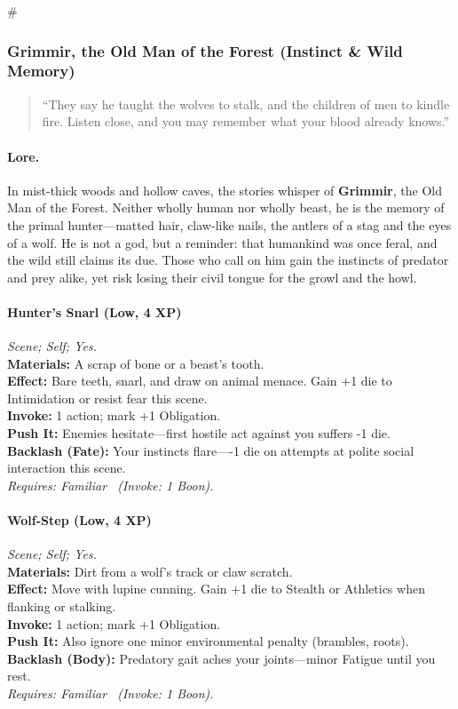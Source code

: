 # %

\subsubsection{Grimmir, the Old Man of the Forest (Instinct \& Wild Memory)}
\begin{quote}
“They say he taught the wolves to stalk, and the children of men to kindle fire. Listen close, and you may remember what your blood already knows.”
\end{quote}

\paragraph{Lore.}
In mist-thick woods and hollow caves, the stories whisper of \textbf{Grimmir}, the Old Man of the Forest. Neither wholly human nor wholly beast, he is the memory of the primal hunter—matted hair, claw-like nails, the antlers of a stag and the eyes of a wolf. He is not a god, but a reminder: that humankind was once feral, and the wild still claims its due. Those who call on him gain the instincts of predator and prey alike, yet risk losing their civil tongue for the growl and the howl.

\paragraph*{Hunter's Snarl (Low, 4 XP)} \emph{Scene; Self; Yes.}\\
\textbf{Materials:} A scrap of bone or a beast's tooth.\\
\textbf{Effect:} Bare teeth, snarl, and draw on animal menace. Gain +1 die to Intimidation or resist fear this scene.\\
\textbf{Invoke:} 1 action; mark +1 Obligation.\\
\textbf{Push It:} Enemies hesitate—first hostile act against you suffers -1 die.\\
\textbf{Backlash (Fate):} Your instincts flare—-1 die on attempts at polite social interaction this scene.\\
\emph{Requires: Familiar \ (\textit{Invoke:} 1 Boon).}

\paragraph*{Wolf-Step (Low, 4 XP)} \emph{Scene; Self; Yes.}\\
\textbf{Materials:} Dirt from a wolf's track or claw scratch.\\
\textbf{Effect:} Move with lupine cunning. Gain +1 die to Stealth or Athletics when flanking or stalking.\\
\textbf{Invoke:} 1 action; mark +1 Obligation.\\
\textbf{Push It:} Also ignore one minor environmental penalty (brambles, roots).\\
\textbf{Backlash (Body):} Predatory gait aches your joints—minor Fatigue until you rest.\\
\emph{Requires: Familiar \ (\textit{Invoke:} 1 Boon).}


